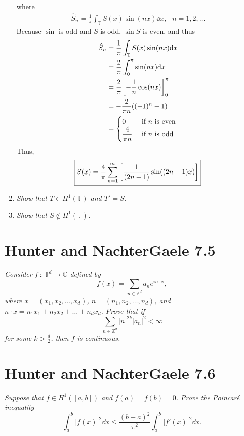 \documentclass[12pt]{article}
\theoremstyle{plain}
\begin{document}
\begin{enumerate}[\bf (a)]
        where
        \begin{align*}
            \hat{S}_n = \frac{1}{\pi}\int_\mathbb{T} S(x)\sin(nx)\dd x,\ \ \ n = 1, 2, \dots
        \end{align*}
        Because $\sin$ is odd and $S$ is odd, $\sin S$ is even, and thus
        \begin{align*}
            \hat{S}_n &= \frac{1}{\pi}\int_\mathbb{T} S(x) \sin(nx) \dd x \\
            &= \frac{2}{\pi}\int_0^\pi \sin(nx)\dd x \\
            &= \frac{2}{\pi}\qty[-\frac{1}{n}\cos(nx)]_0^\pi \\
            &= -\frac{2}{\pi n}\qty((-1)^n - 1) \\
            &= \begin{cases}
                0 & \text{ if $n$ is even} \\
                \dfrac{4}{\pi n} & \text{ if $n$ is odd}
            \end{cases}
        \end{align*}
        Thus,
        \begin{align*}
            \boxed{S(x) = \frac{4}{\pi}\sum_{n=1}^\infty\qty[\frac{1}{(2n-1)}\sin((2n-1)x)]}
        \end{align*}
    \item
        \emph{Show that $T \in H^1(\mathbb{T})$ and $T' = S$.}
    \item
        \emph{Show that $S \not\in H^1(\mathbb{T})$.}
\end{enumerate}

\section*{Hunter and NachterGaele 7.5}
\emph{Consider $f\ :\ \mathbb{T}^d \rightarrow \mathbb{C}$ defined by $$f(x) = \sum_{n\in\mathbb{Z}^d}a_n e^{i n \cdot x},$$ where $x = (x_1, x_2, \dots, x_d)$, $n = (n_1, n_2, \dots, n_d)$, and $n\cdot x = n_1x_1 + n_2x_2 + \dots + n_dx_d$.  Prove that if $$\sum_{n\in\mathbb{Z}^d}|n|^{2k}|a_n|^2 <\infty$$ for some $k > \frac{d}{2}$, then $f$ is continuous.}

\section*{Hunter and NachterGaele 7.6}
\emph{Suppose that $f \in H^1([a,b])$ and $f(a) = f(b) = 0$.  Prove the \emph{Poincar\'{e} inequality} $$\int_a^b|f(x)|^2 \dd x \leq \frac{(b-a)^2}{\pi^2}\int_a^b|f'(x)|^2 \dd x.$$}
\end{document}
